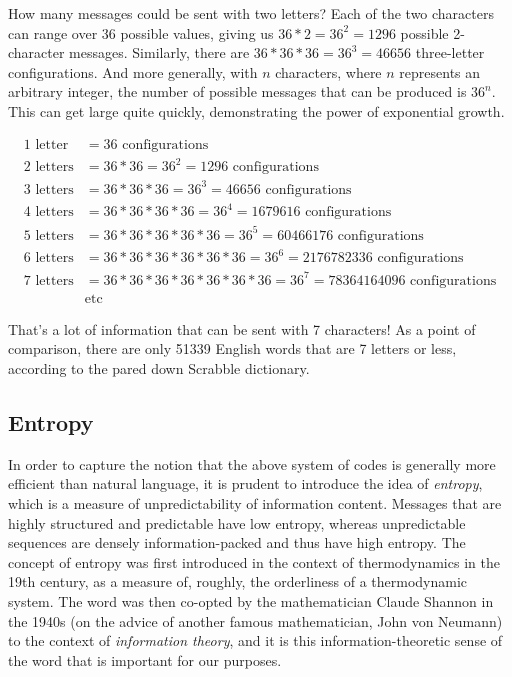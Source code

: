 \documentclass[UTF8]{book}
\begin{document}
\begin{CJK}{UTF8}{gbsn}
How many messages could be sent with two letters? Each of the two characters can range over 36 possible values, giving us $36*2=36^{2}=1296$ possible 2-character messages. Similarly, there are $36*36*36=36^{3}=46656$ three-letter configurations. And more generally, with $n$ characters, where $n$ represents an arbitrary integer, the number of possible messages that can be produced is $36^{n}$. This can get large quite quickly, demonstrating the power of exponential growth.

\begin{align*}
1 \text{ letter} &= 36 \text{ configurations} \\
2 \text{ letters} &= 36*36 = 36^{2} = 1296 \text{ configurations} \\
3 \text{ letters} &= 36*36*36 = 36^{3} = 46656 \text{ configurations} \\
4 \text{ letters} &= 36*36*36*36 = 36^{4} = 1679616 \text{ configurations} \\
5 \text{ letters} &= 36*36*36*36*36 = 36^{5} = 60466176 \text{ configurations} \\
6 \text{ letters} &= 36*36*36*36*36*36 = 36^{6} = 2176782336 \text{ configurations} \\
7 \text{ letters} &= 36*36*36*36*36*36*36 = 36^{7} = 78364164096 \text{ configurations} \\
&\text{etc}
\end{align*}

That's a lot of information that can be sent with 7 characters! As a point of comparison, there are only 51339 English words that are 7 letters or less, according to the pared down Scrabble dictionary.

\subsection{Entropy}

In order to capture the notion that the above system of codes is generally more efficient than natural language, it is prudent to introduce the idea of \emph{entropy}, which is a measure of unpredictability of information content. Messages that are highly structured and predictable have low entropy, whereas unpredictable sequences are densely information-packed and thus have high entropy. The concept of entropy was first introduced in the context of thermodynamics in the 19th century, as a measure of, roughly, the orderliness of a thermodynamic system. The word was then co-opted by the mathematician Claude Shannon in the 1940s (on the advice of another famous mathematician, John von Neumann) to the context of \emph{information theory}, and it is this information-theoretic sense of the word that is important for our purposes.


\end{CJK}
\end{document}
